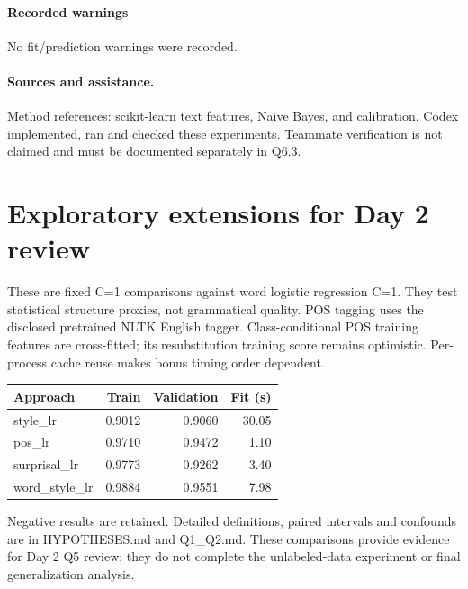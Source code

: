 \paragraph{Recorded warnings}

No fit/prediction warnings were recorded.

\paragraph{Sources and assistance.}

Method references: \href{https://scikit-learn.org/stable/modules/feature_extraction.html}{scikit-learn text features}, \href{https://scikit-learn.org/stable/modules/naive_bayes.html}{Naive Bayes}, and \href{https://scikit-learn.org/stable/modules/calibration.html}{calibration}. Codex implemented, ran and checked these experiments. Teammate verification is not claimed and must be documented separately in Q6.3.

\section*{Exploratory extensions for Day 2 review}

These are fixed C=1 comparisons against word logistic regression C=1. They test statistical structure proxies, not grammatical quality. POS tagging uses the disclosed pretrained NLTK English tagger. Class-conditional POS training features are cross-fitted; its resubstitution training score remains optimistic. Per-process cache reuse makes bonus timing order dependent.

\begin{center}\small\begin{tabular}{p{5cm}rrr}
\toprule
Approach & Train & Validation & Fit (s) \\
\midrule
style\_lr & 0.9012 & 0.9060 & 30.05 \\
pos\_lr & 0.9710 & 0.9472 & 1.10 \\
surprisal\_lr & 0.9773 & 0.9262 & 3.40 \\
word\_style\_lr & 0.9884 & 0.9551 & 7.98 \\
\bottomrule\end{tabular}\end{center}

Negative results are retained. Detailed definitions, paired intervals and confounds are in HYPOTHESES.md and Q1\_Q2.md. These comparisons provide evidence for Day 2 Q5 review; they do not complete the unlabeled-data experiment or final generalization analysis.

